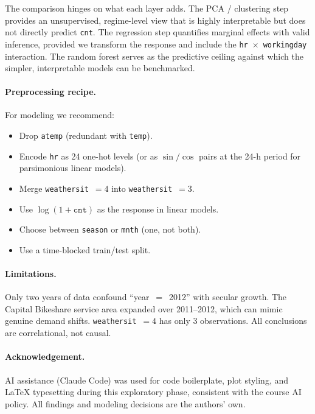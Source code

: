 \documentclass[11pt]{article}
\begin{document}
The comparison hinges on what each layer adds. The PCA / clustering
step provides an unsupervised, regime-level view that is highly
interpretable but does not directly predict \texttt{cnt}. The
regression step quantifies marginal effects with valid inference,
provided we transform the response and include the
\texttt{hr}~$\times$~\texttt{workingday} interaction. The random
forest serves as the predictive ceiling against which the simpler,
interpretable models can be benchmarked.

\paragraph{Preprocessing recipe.}
For modeling we recommend:
\begin{itemize}
\item Drop \texttt{atemp} (redundant with \texttt{temp}).
\item Encode \texttt{hr} as 24 one-hot levels (or as
      $\sin/\cos$ pairs at the 24-h period for parsimonious linear
      models).
\item Merge \texttt{weathersit}~$=4$ into \texttt{weathersit}~$=3$.
\item Use $\log(1+\texttt{cnt})$ as the response in linear models.
\item Choose between \texttt{season} or \texttt{mnth} (one, not both).
\item Use a time-blocked train/test split.
\end{itemize}

\paragraph{Limitations.}
Only two years of data confound ``year~$=$~2012'' with secular growth.
The Capital Bikeshare service area expanded over 2011--2012, which can
mimic genuine demand shifts. \texttt{weathersit}~$=4$ has only 3
observations. All conclusions are correlational, not causal.

\paragraph{Acknowledgement.} AI assistance (Claude Code) was used for
code boilerplate, plot styling, and LaTeX typesetting during this
exploratory phase, consistent with the course AI policy. All findings
and modeling decisions are the authors' own.
\end{document}
